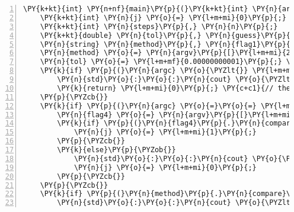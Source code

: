 \begin{Verbatim}[commandchars=\\\{\},numbers=left,firstnumber=1,stepnumber=1]
\PY{k+kt}{int} \PY{n+nf}{main}\PY{p}{(}\PY{k+kt}{int} \PY{n}{argc}\PY{p}{,} \PY{k+kt}{char}\PY{o}{*} \PY{n}{argv}\PY{p}{[}\PY{p}{]}\PY{p}{)}\PY{p}{\PYZob{}}
	\PY{k+kt}{int} \PY{n}{j} \PY{o}{=} \PY{l+m+mi}{0}\PY{p}{;} 
	\PY{k+kt}{int} \PY{n}{steps}\PY{p}{,} \PY{n}{n}\PY{p}{;}
	\PY{k+kt}{double} \PY{n}{tol}\PY{p}{,} \PY{n}{guess}\PY{p}{;}
	\PY{n}{string} \PY{n}{method}\PY{p}{,} \PY{n}{flag1}\PY{p}{,} \PY{n}{flag4}\PY{p}{;}
	\PY{n}{method} \PY{o}{=} \PY{n}{argv}\PY{p}{[}\PY{l+m+mi}{2}\PY{p}{]}\PY{p}{;} \PY{c+c1}{// allow us to check this is given correctly later}
	\PY{n}{tol} \PY{o}{=} \PY{l+m+mf}{0.00000000001}\PY{p}{;} \PY{c+c1}{// set the tolerance}
	\PY{k}{if} \PY{p}{(}\PY{n}{argc} \PY{o}{\PYZlt{}} \PY{l+m+mi}{4}\PY{p}{)}\PY{p}{\PYZob{}}
		\PY{n}{std}\PY{o}{:}\PY{o}{:}\PY{n}{cout} \PY{o}{\PYZlt{}}\PY{o}{\PYZlt{}} \PY{l+s}{\PYZdq{}}\PY{l+s}{Usage: ode [\PYZhy{}b1/\PYZhy{}b2/\PYZhy{}i] [method] [steps] \PYZhy{}f}\PY{l+s}{\PYZdq{}} \PY{o}{\PYZlt{}}\PY{o}{\PYZlt{}} \PY{n}{std}\PY{o}{:}\PY{o}{:}\PY{n}{endl}\PY{p}{;}
		\PY{k}{return} \PY{l+m+mi}{0}\PY{p}{;} \PY{c+c1}{// the minimum number of arguements is 3}
	\PY{p}{\PYZcb{}}
	\PY{k}{if} \PY{p}{(}\PY{n}{argc} \PY{o}{=}\PY{o}{=} \PY{l+m+mi}{5}\PY{p}{)}\PY{p}{\PYZob{}}
		\PY{n}{flag4} \PY{o}{=} \PY{n}{argv}\PY{p}{[}\PY{l+m+mi}{4}\PY{p}{]}\PY{p}{;}
		\PY{k}{if} \PY{p}{(}\PY{n}{flag4}\PY{p}{.}\PY{n}{compare}\PY{p}{(}\PY{l+s}{\PYZdq{}}\PY{l+s}{\PYZhy{}f}\PY{l+s}{\PYZdq{}}\PY{p}{)} \PY{o}{=}\PY{o}{=} \PY{l+m+mi}{0}\PY{p}{)}\PY{p}{\PYZob{}}
			\PY{n}{j} \PY{o}{=} \PY{l+m+mi}{1}\PY{p}{;}
		\PY{p}{\PYZcb{}}
		\PY{k}{else}\PY{p}{\PYZob{}}
			\PY{n}{std}\PY{o}{:}\PY{o}{:}\PY{n}{cout} \PY{o}{\PYZlt{}}\PY{o}{\PYZlt{}} \PY{l+s}{\PYZdq{}}\PY{l+s}{Assuming not writing into file}\PY{l+s}{\PYZdq{}} \PY{o}{\PYZlt{}}\PY{o}{\PYZlt{}} \PY{n}{std}\PY{o}{:}\PY{o}{:}\PY{n}{endl}\PY{p}{;}
			\PY{n}{j} \PY{o}{=} \PY{l+m+mi}{0}\PY{p}{;}
		\PY{p}{\PYZcb{}}
	\PY{p}{\PYZcb{}}
	\PY{k}{if} \PY{p}{(}\PY{n}{method}\PY{p}{.}\PY{n}{compare}\PY{p}{(}\PY{l+s}{\PYZdq{}}\PY{l+s}{euler}\PY{l+s}{\PYZdq{}}\PY{p}{)} \PY{o}{!}\PY{o}{=} \PY{l+m+mi}{0} \PY{o}{\PYZam{}}\PY{o}{\PYZam{}} \PY{n}{method}\PY{p}{.}\PY{n}{compare}\PY{p}{(}\PY{l+s}{\PYZdq{}}\PY{l+s}{midpoint}\PY{l+s}{\PYZdq{}}\PY{p}{)} \PY{o}{!}\PY{o}{=} \PY{l+m+mi}{0} \PY{o}{\PYZam{}}\PY{o}{\PYZam{}} \PY{n}{method}\PY{p}{.}\PY{n}{compare}\PY{p}{(}\PY{l+s}{\PYZdq{}}\PY{l+s}{runge\PYZhy{}kutta}\PY{l+s}{\PYZdq{}}\PY{p}{)} \PY{o}{!}\PY{o}{=} \PY{l+m+mi}{0}\PY{p}{)} \PY{p}{\PYZob{}}
		\PY{n}{std}\PY{o}{:}\PY{o}{:}\PY{n}{cout} \PY{o}{\PYZlt{}}\PY{o}{\PYZlt{}} \PY{l+s}{\PYZdq{}}\PY{l+s}{Please choose either the euler, midpoint or runge\PYZhy{}kutta method}\PY{l+s}{\PYZdq{}} \PY{o}{\PYZlt{}}\PY{o}{\PYZlt{}} \PY{n}{endl}\PY{p}{;}

\end{Verbatim}
